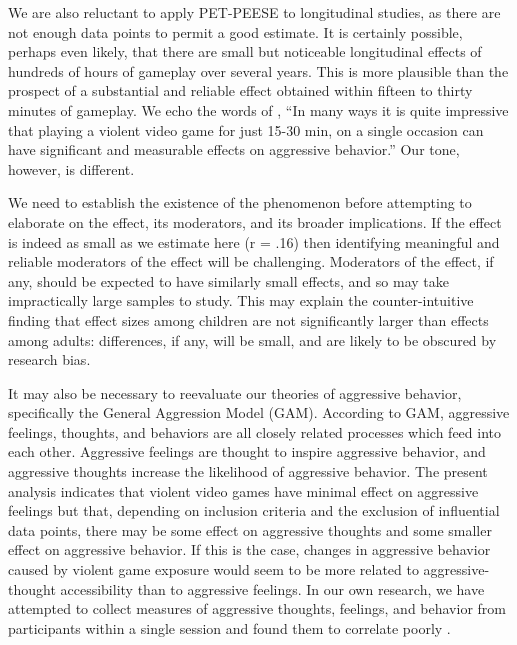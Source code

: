 \documentclass[man]{apa6}
\begin{document}
We are also reluctant to apply PET-PEESE to longitudinal studies, as there are not enough data points to permit a good estimate. It is certainly possible, perhaps even likely, that there are small but noticeable longitudinal effects of hundreds of hours of gameplay over several years. This is more plausible than the prospect of a substantial and reliable effect obtained within fifteen to thirty minutes of gameplay. We echo the words of \citet[p. 51]{Bushman:Huesmann:2014}, ``In many ways it is quite impressive that playing a violent video game for just 15-30 min, on a single occasion can have significant and measurable effects on aggressive behavior.'' Our tone, however, is different.

We need to establish the existence of the phenomenon before attempting to elaborate on the effect, its moderators, and its broader implications. If the effect is indeed as small as we estimate here (r = .16) then identifying meaningful and reliable moderators of the effect will be challenging.  Moderators of the effect, if any, should be expected to have similarly small effects, and so may take impractically large samples to study. This may explain the counter-intuitive finding that effect sizes among children are not significantly larger than effects among adults: differences, if any, will be small, and are likely to be obscured by research bias. 

It may also be necessary to reevaluate our theories of aggressive behavior, specifically the General Aggression Model (GAM). According to GAM, aggressive feelings, thoughts, and behaviors are all closely related processes which feed into each other. Aggressive feelings are thought to inspire aggressive behavior, and aggressive thoughts increase the likelihood of aggressive behavior. The present analysis indicates that violent video games have minimal effect on aggressive feelings \citep[a finding paralleled by][]{Przybylski:etal:2014} but that, depending on inclusion criteria and the exclusion of influential data points, there may be some effect on aggressive thoughts and some smaller effect on aggressive behavior. If this is the case, changes in aggressive behavior caused by violent game exposure would seem to be more related to aggressive-thought accessibility than to aggressive feelings. In our own research, we have attempted to collect measures of aggressive thoughts, feelings, and behavior from participants within a single session and found them to correlate poorly \citep{Engelhardt:etal:2015}.
\end{document}
